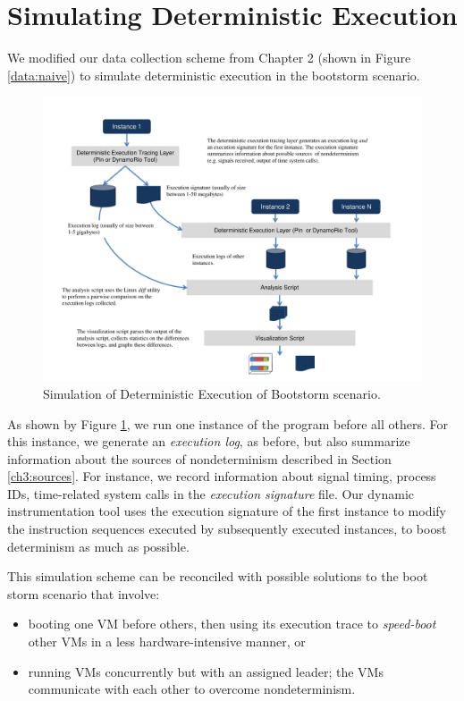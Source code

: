 \section{Simulating Deterministic Execution} \label{ch3:simulation}
We modified our data collection scheme from Chapter 2 (shown in Figure \ref{data:naive})
to simulate deterministic execution in the bootstorm scenario.

\begin{figure}[h]
  \center
  \includegraphics[scale=0.7, trim=1cm 0cm 1cm 0cm]
                  {simulation.pdf}
  \caption[Simulation of Deterministic Execution of Bootstorm scenario]%
  {Simulation of Deterministic Execution of Bootstorm scenario.}
  \label{ch3:figsimulation}
\end{figure}

As shown by Figure \ref{ch3:figsimulation}, we run one instance of the program before all others.
For this instance, we generate an {\em execution log}, as before,
but also summarize information about the sources of nondeterminism
described in Section \ref{ch3:sources}. For instance, we record
information about signal timing, process IDs, time-related system calls
in the {\em execution signature} file. Our dynamic instrumentation tool
uses the execution signature of the first instance 
to modify the instruction sequences executed by subsequently
executed instances, to boost determinism as much as possible.

This simulation scheme can be reconciled with possible solutions to the 
boot storm scenario that involve:
\begin{itemize}
\item
booting one VM before others,
then using its execution trace to {\em speed-boot} other VMs
in a less hardware-intensive manner, or
\item 
running VMs concurrently but with an assigned leader;
the VMs communicate with each other to overcome
nondeterminism.
\end{itemize}

